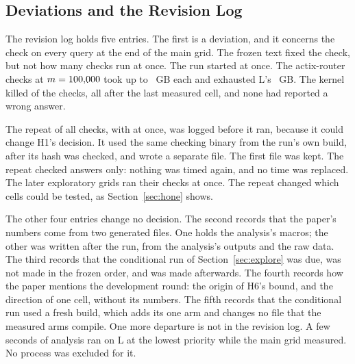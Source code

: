 \subsection{Deviations and the Revision Log}\label{sec:deviation}

The revision log holds five entries. The first is a deviation, and it concerns the check on every
query at the end of the main grid. The frozen text fixed the check, but not how many checks run at
once. The run started
\VerifyJobsFirst{} at once. The actix-router checks at $m=100{,}000$ took up to
\VerifyCheckGB~GB each and exhausted L's \VerifyMemoryGB~GB. The kernel killed \VerifyKilled{} of the
\VerifyCut{} checks, all after the last measured cell, and none had reported a wrong answer.

The repeat of all \VerifyCut{} checks, with \VerifyJobsRepeat{} at once, was logged before it ran,
because it could change H1's decision. It used the same checking binary from the run's own build,
after its hash was checked, and wrote a separate file. The first file was kept. The repeat checked
answers only: nothing was timed again, and no time was replaced. The later exploratory grids ran their
checks \VerifyJobsRepeat{} at once. The repeat changed which cells could be tested, as
Section~\ref{sec:hone} shows.

The other four entries change no decision. The second records that the paper's numbers come from two
generated files. One holds the analysis's macros; the other was written after the run, from the
analysis's outputs and the raw data. The third records that the conditional run of
Section~\ref{sec:explore} was due, was not made in the frozen order, and was made afterwards. The
fourth records how the
paper mentions the development round: the origin of H6's bound, and the direction of one cell,
without its numbers. The fifth records that the conditional run used a fresh build, which adds its one
arm and changes no file that the measured arms compile. One more departure is not in the revision log. A few seconds of analysis ran on L at
the lowest priority while the main grid measured. No process was excluded for it.
